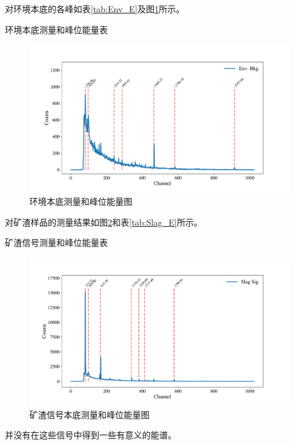 \documentclass{article}
\begin{document}
    对环境本底的各峰如表\ref{tab:Env_E}及图\ref{fig:Env_E}所示。
    \begin{table}[htbp]
        \centering
        \caption{环境本底测量和峰位能量表\label{tab:Env_E}}
        
    \end{table}
    \begin{figure}[htbp]
        \centering
        \includegraphics[width=\textwidth]{../plots/Env_E.pdf}
        \caption{环境本底测量和峰位能量图\label{fig:Env_E}}
    \end{figure}
    对矿渣样品的测量结果如图\ref{fig:Slag_E}和表\ref{tab:Slag_E}所示。
    \begin{table}[htbp]
        \centering
        \caption{矿渣信号测量和峰位能量表\label{tab:Slag_E}}
        
    \end{table}
    \begin{figure}[htbp]
        \centering
        \includegraphics[width=\textwidth]{../plots/Slag_E.pdf}
        \caption{矿渣信号本底测量和峰位能量图\label{fig:Slag_E}}
    \end{figure}
    并没有在这些信号中得到一些有意义的能谱。
\end{document}
